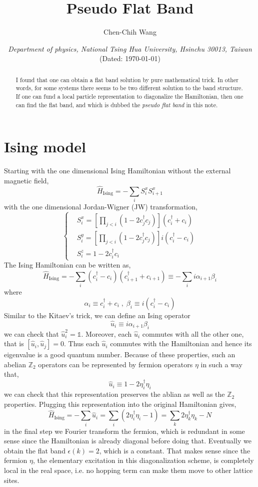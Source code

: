 \documentclass[12font]{article}
\title{\textbf{ Pseudo Flat Band }}
\author{Chen-Chih Wang  }
\date{\textit{Department of physics, National Tsing Hua University, Hsinchu 30013, Taiwan} \\ (Dated: \today)}
\newcommand{\lr}[1]{\left(  #1  \right)}
\newcommand{\lrm}[1]{\left[  #1  \right]}
\newcommand{\mrm}[1]{\mathrm{#1}}
\begin{document}
\maketitle



\begin{abstract}
  I found that one can obtain a flat band solution by pure mathematical trick. In other words, for some systems there seems to be two different solution to the band structure. If one can fund a local particle representation to diagonalize the Hamiltonian, then one can find the flat band, and which is dubbed the \emph{pseudo flat band} in this note.
\end{abstract}

\section{Ising model}
Starting with the one dimensional Ising Hamiltonian without the external magnetic field,
\[
\hat{H}_{\mrm{Ising}} = -\sum_{i}S^x_i S^x_{i+1}
\]
with the one dimensional Jordan-Wigner (JW) transformation,
\[
\left\{
\begin{aligned}
& S^x_i = \lrm{\prod_{j<i}\lr{1-2c_j^\dagger c_j}}\lr{c_i^\dagger + c_i} \\
& S^y_i = \lrm{\prod_{j<i}\lr{1-2c_j^\dagger c_j}}i\lr{c_i^\dagger - c_i} \\
& S^z_i = 1 - 2c_i^\dagger c_i
\end{aligned}
\right.
\]
The Ising Hamiltonian can be written as,
\[
\hat{H}_{\mrm{Ising}} = -\sum_{i}\lr{c_i^\dagger - c_i}\lr{c_{i+1}^\dagger + c_{i+1}} \equiv -\sum_{i}i\alpha_{i+1}\beta_{i}
\]
where 
\[
\alpha_i \equiv c_i^\dagger + c_i \;,\; \beta_i \equiv i\lr{c_i^\dagger - c_i}
\]
Similar to the Kitaev's trick, we can define an Ising operator
\[\hat{u}_i \equiv i\alpha_{i+1}\beta_i\]
we can check that $\hat{u}_i^2 = \mathds{1}$. Moreover, each $\hat{u}_i$ commutes with all the other one, that is $[\hat{u}_i,\hat{u}_j] = 0$. Thus each $\hat{u}_i$ commutes with the Hamiltonian and hence its eigenvalue is a good quantum number. Because of these properties, such an abelian $\mathbb{Z}_2$ operators can be represented by fermion operators $\eta$ in such a way that,
\[
\hat{u}_i \equiv 1 - 2\eta_i^\dagger \eta_i
\]
we can check that this representation preserves the ablian as well as the $\mathbb{Z}_2$ properties. Plugging this representation into the original Hamiltonian gives,
\[
\hat{H}_{\mrm{Ising}} = -\sum_{i}\hat{u}_i = \sum_{i}\lr{2\eta_i^\dagger\eta_i - 1} = \sum_{k}2\eta_k^\dagger\eta_k - N
\]
in the final step we Fourier transform the fermion, which is redundant in some sense since the Hamiltonian is already diagonal before doing that. Eventually we obtain the flat band $\epsilon(k) = 2$, which is a constant. That makes sense since the fermion $\eta$, the elementary excitation in this diagonalization scheme, is completely local in the real space, i.e. no hopping term can make them move to other lattice sites. 
\end{document}
